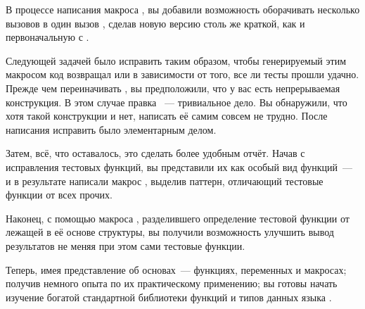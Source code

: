 В процессе написания макроса , вы добавили возможность оборачивать несколько
вызовов  в один вызов , сделав новую версию 
столь же краткой, как и первоначальную с .

Следующей задачей было исправить  таким образом, чтобы генерируемый этим
макросом код возвращал  или  в зависимости от того, все ли тесты прошли
удачно. Прежде чем переиначивать , вы предположили, что у вас есть
непрерываемая  конструкция. В этом случае правка ~--- тривиальное
дело. Вы обнаружили, что хотя такой конструкции и нет, написать её самим совсем не
трудно. После написания  исправить  было элементарным
делом.

Затем, всё, что оставалось, это сделать более удобным отчёт. Начав с исправления тестовых
функций, вы представили их как особый вид функций~--- и в результате написали макрос
, выделив паттерн, отличающий тестовые функции от всех прочих.

Наконец, с помощью макроса , разделившего определение тестовой функции от
лежащей в её основе структуры, вы получили возможность улучшить вывод результатов не меняя
при этом сами тестовые функции.

Теперь, имея представление об основах~--- функциях, переменных и макросах; получив немного
опыта по их практическому применению; вы готовы начать изучение богатой стандартной
библиотеки функций и типов данных языка .


